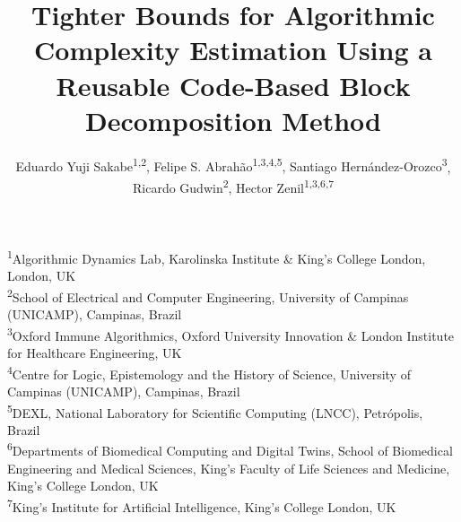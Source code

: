 \documentclass{article}
\title{Tighter Bounds for Algorithmic Complexity Estimation Using a Reusable Code-Based Block Decomposition Method}
\author{
{\small Eduardo Yuji Sakabe\textsuperscript{1,2},
Felipe S. Abrahão\textsuperscript{1,3,4,5},
Santiago Hernández-Orozco\textsuperscript{3}},\\
{\small Ricardo Gudwin\textsuperscript{2},
Hector Zenil\textsuperscript{1,3,6,7}}
}
\date{}
\begin{document}
\maketitle

\vspace{-2.0em}

\begin{center}
\scriptsize

\textsuperscript{1}Algorithmic Dynamics Lab, Karolinska Institute \& King's College London, London, UK \\

\textsuperscript{2}School of Electrical and Computer Engineering, University of Campinas (UNICAMP), Campinas, Brazil \\

\textsuperscript{3}Oxford Immune Algorithmics, Oxford University Innovation \& London Institute for Healthcare Engineering, UK \\

\textsuperscript{4}Centre for Logic, Epistemology and the History of Science, University of Campinas (UNICAMP), Campinas, Brazil \\

\textsuperscript{5}DEXL, National Laboratory for Scientific Computing (LNCC), Petrópolis, Brazil \\

\textsuperscript{6}Departments of Biomedical Computing and Digital Twins, School of Biomedical Engineering and Medical Sciences, King's Faculty of Life Sciences and Medicine, King's College London, UK \\

\textsuperscript{7}King's Institute for Artificial Intelligence, King's College London, UK
\end{center}


\vspace{1.0em}
\end{document}
